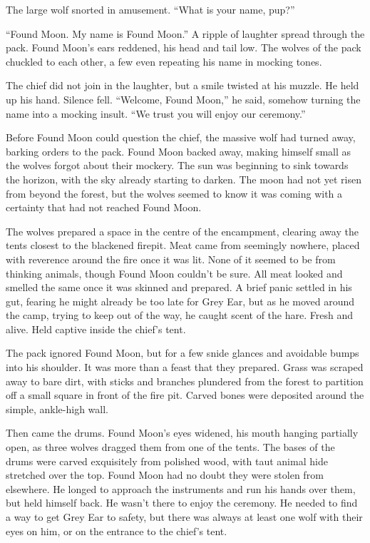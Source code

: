 The large wolf snorted in amusement. ``What is your name, pup?''

``Found Moon. My name is Found Moon.'' A ripple of laughter spread through the pack. Found Moon's ears reddened, his head and tail low. The wolves of the pack chuckled to each other, a few even repeating his name in mocking tones.

The chief did not join in the laughter, but a smile twisted at his muzzle. He held up his hand. Silence fell. ``Welcome, Found Moon,'' he said, somehow turning the name into a mocking insult. ``We trust you will enjoy our ceremony.''

Before Found Moon could question the chief, the massive wolf had turned away, barking orders to the pack. Found Moon backed away, making himself small as the wolves forgot about their mockery. The sun was beginning to sink towards the horizon, with the sky already starting to darken. The moon had not yet risen from beyond the forest, but the wolves seemed to know it was coming with a certainty that had not reached Found Moon.

The wolves prepared a space in the centre of the encampment, clearing away the tents closest to the blackened firepit. Meat came from seemingly nowhere, placed with reverence around the fire once it was lit. None of it seemed to be from thinking animals, though Found Moon couldn't be sure. All meat looked and smelled the same once it was skinned and prepared. A brief panic settled in his gut, fearing he might already be too late for Grey Ear, but as he moved around the camp, trying to keep out of the way, he caught scent of the hare. Fresh and alive. Held captive inside the chief's tent.

The pack ignored Found Moon, but for a few snide glances and avoidable bumps into his shoulder. It was more than a feast that they prepared. Grass was scraped away to bare dirt, with sticks and branches plundered from the forest to partition off a small square in front of the fire pit. Carved bones were deposited around the simple, ankle-high wall.

Then came the drums. Found Moon's eyes widened, his mouth hanging partially open, as three wolves dragged them from one of the tents. The bases of the drums were carved exquisitely from polished wood, with taut animal hide stretched over the top. Found Moon had no doubt they were stolen from elsewhere. He longed to approach the instruments and run his hands over them, but held himself back. He wasn't there to enjoy the ceremony. He needed to find a way to get Grey Ear to safety, but there was always at least one wolf with their eyes on him, or on the entrance to the chief's tent.

